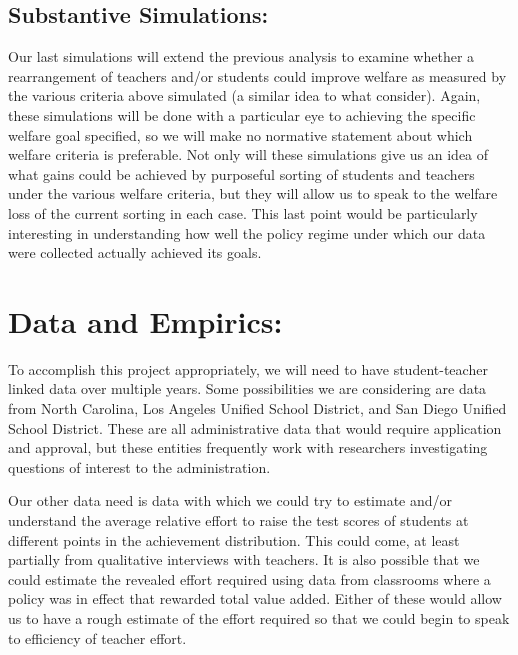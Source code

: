 \documentclass[letterpaper,12pt]{article}
\begin{document}
\subsection{Substantive Simulations:}

Our last simulations will extend the previous analysis to examine whether a rearrangement of teachers and/or students could improve welfare as measured by the various criteria above simulated (a similar idea to what \citet{condie2014teacher} consider). Again, these simulations will be done with a particular eye to achieving the specific welfare goal specified, so we will make no normative statement about which welfare criteria is preferable. Not only will these simulations give us an idea of what gains could be achieved by purposeful sorting of students and teachers under the various welfare criteria, but they will allow us to speak to the welfare loss of the current sorting in each case. This last point would be particularly interesting in understanding how well the policy regime under which our data were collected actually achieved its goals. 




\section{Data and Empirics:}

To accomplish this project appropriately, we will need to have student-teacher linked data over multiple years. Some possibilities we are considering are data from North Carolina, Los Angeles Unified School District, and San Diego Unified School District. These are all administrative data that would require application and approval, but these entities frequently work with researchers investigating questions of interest to the administration.

Our other data need is data with which we could try to estimate and/or understand the average relative effort to raise the test scores of students at different points in the achievement distribution. This could come, at least partially from qualitative interviews with teachers. It is also possible that we could estimate the revealed effort required using data from classrooms where a policy was in effect that rewarded total value added. Either of these would allow us to have a rough estimate of the effort required so that we could begin to speak to efficiency of teacher effort.




    
\end{document}

